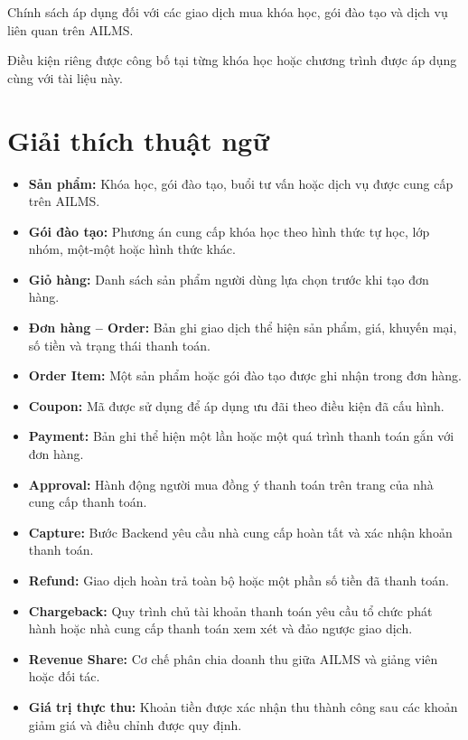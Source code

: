\documentclass[12pt,a4paper]{article}
\begin{document}
Chính sách áp dụng đối với các giao dịch mua khóa học,
gói đào tạo và dịch vụ liên quan trên AILMS.

Điều kiện riêng được công bố tại từng khóa học hoặc chương trình
được áp dụng cùng với tài liệu này.

\section{Giải thích thuật ngữ}

\begin{itemize}
    \item \textbf{Sản phẩm:} Khóa học, gói đào tạo,
    buổi tư vấn hoặc dịch vụ được cung cấp trên AILMS.

    \item \textbf{Gói đào tạo:} Phương án cung cấp khóa học theo hình thức
    tự học, lớp nhóm, một-một hoặc hình thức khác.

    \item \textbf{Giỏ hàng:} Danh sách sản phẩm người dùng lựa chọn
    trước khi tạo đơn hàng.

    \item \textbf{Đơn hàng -- Order:} Bản ghi giao dịch thể hiện
    sản phẩm, giá, khuyến mại, số tiền và trạng thái thanh toán.

    \item \textbf{Order Item:} Một sản phẩm hoặc gói đào tạo
    được ghi nhận trong đơn hàng.

    \item \textbf{Coupon:} Mã được sử dụng để áp dụng ưu đãi
    theo điều kiện đã cấu hình.

    \item \textbf{Payment:} Bản ghi thể hiện một lần hoặc một quá trình
    thanh toán gắn với đơn hàng.

    \item \textbf{Approval:} Hành động người mua đồng ý thanh toán
    trên trang của nhà cung cấp thanh toán.

    \item \textbf{Capture:} Bước Backend yêu cầu nhà cung cấp
    hoàn tất và xác nhận khoản thanh toán.

    \item \textbf{Refund:} Giao dịch hoàn trả toàn bộ hoặc một phần
    số tiền đã thanh toán.

    \item \textbf{Chargeback:} Quy trình chủ tài khoản thanh toán
    yêu cầu tổ chức phát hành hoặc nhà cung cấp thanh toán
    xem xét và đảo ngược giao dịch.

    \item \textbf{Revenue Share:} Cơ chế phân chia doanh thu
    giữa AILMS và giảng viên hoặc đối tác.

    \item \textbf{Giá trị thực thu:} Khoản tiền được xác nhận thu thành công
    sau các khoản giảm giá và điều chỉnh được quy định.
\end{itemize}
\end{document}
